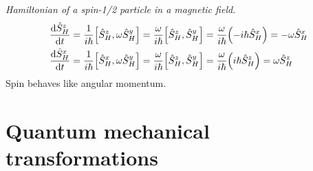 \documentclass{report}
\begin{document}
\begin{subquests}
	\item \emph{Hamiltonian of a spin-1/2 particle in a magnetic field.}
	\begin{align*}
		\dv{\hat{S}^z_H}{t} & = \frac{1}{i\hbar}\bqty{\hat{S}^z_H,\omega\hat{S}^y_H} = \frac{\omega}{i\hbar}\bqty{\hat{S}^z_H,\hat{S}^y_H} = \frac{\omega}{i\hbar}\pqty{-i\hbar\hat{S}^x_H} = -\omega\hat{S}^x_H \\
		\dv{\hat{S}^x_H}{t} & = \frac{1}{i\hbar}\bqty{\hat{S}^x_H,\omega\hat{S}^y_H} = \frac{\omega}{i\hbar}\bqty{\hat{S}^z_H,\hat{S}^y_H} = \frac{\omega}{i\hbar}\pqty{i\hbar\hat{S}^z_H} = \omega\hat{S}^z_H 
	\end{align*}
	Spin behaves like angular momentum.
\end{subquests}

\chapter{Quantum mechanical transformations}
\end{document}
